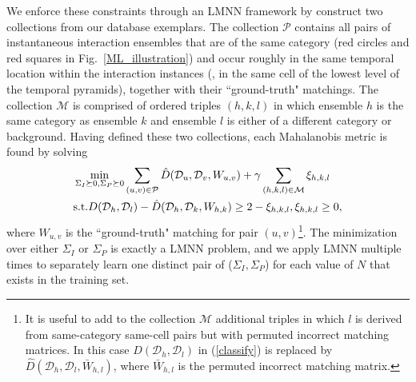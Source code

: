 We enforce these constraints through an LMNN framework by construct two collections from our database exemplars. The collection $\mathcal{P}$ contains all pairs of instantaneous interaction ensembles that are of the same category (red circles and red squares in Fig.~\ref{ML_illustration}) and occur roughly in the same temporal location within the interaction instances (\ie, in the same cell of the lowest level of the temporal pyramids), together with their ``ground-truth" matchings. The collection $\mathcal{M}$ is comprised of ordered triples $(h,k,l)$ in which ensemble $h$ is the same category as ensemble $k$ and ensemble $l$ is either of a different category or background. Having defined these two collections, each Mahalanobis metric is found by solving
\begin{equation}
\vspace{-5pt}
\label{classify}
\begin{split}
&\min_{\Sigma_{I}\succeq 0, \Sigma_{P}\succeq 0} \sum_{(u,v)\in\mathcal{P}}\hat{D}(\mathcal{D}_{u}, \mathcal{D}_{v}, W_{u,v})+\gamma\sum_{(h,k,l)\in\mathcal{M}}\xi_{h,k,l}\\
&\textup{s.t.}  D(\mathcal{D}_{h}, \mathcal{D}_{l})-\hat{D}(\mathcal{D}_{h}, \mathcal{D}_{k}, W_{h,k})\ge 2-\xi_{h,k,l}, \xi_{h,k,l}\ge0,
\end{split}
\end{equation}
where $W_{u,v}$ is the ``ground-truth" matching for pair $(u,v)$\footnote{It is useful to add to the collection $\mathcal{M}$ additional triples in which $l$ is derived from same-category same-cell pairs but with permuted incorrect matching matrices. In this case $D(\mathcal{D}_{h}, \mathcal{D}_{l})$ in (\ref{classify}) is replaced by $\hat{D}(\mathcal{D}_{h}, \mathcal{D}_{l}, \bar{W}_{h,l})$, where $\bar{W}_{h,l}$ is the permuted incorrect matching matrix.}. The minimization over either $\Sigma_{I}$ or $\Sigma_{P}$ is exactly a LMNN problem\cite{Weinberger:ML}, and we apply LMNN multiple times to separately learn one distinct pair of ($\Sigma_{I}, \Sigma_{P}$) for each value of $N$ that exists in the training set. 


